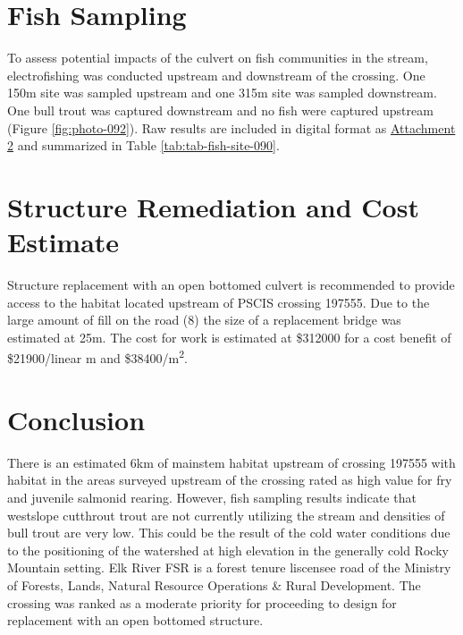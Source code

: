 \documentclass[
]{book}
\begin{document}
\hypertarget{fish-sampling-2}{%
\section*{Fish Sampling}\label{fish-sampling-2}}

To assess potential impacts of the culvert on fish communities in the stream, electrofishing was conducted upstream and downstream of the crossing. One 150m site was sampled upstream and one 315m site was sampled downstream. One bull trout was captured downstream and no fish were captured upstream (Figure \ref{fig:photo-092}). Raw results are included in digital format as \href{https://github.com/NewGraphEnvironment/fish_passage_elk_2020_reporting/raw/master/data/habitat_confirmations.xls}{Attachment 2} and summarized in Table \ref{tab:tab-fish-site-090}.

\hypertarget{structure-remediation-and-cost-estimate-6}{%
\section*{Structure Remediation and Cost Estimate}\label{structure-remediation-and-cost-estimate-6}}

Structure replacement with an open bottomed culvert is recommended to provide access to the habitat located upstream of PSCIS crossing 197555. Due to the large amount of fill on the road (8) the size of a replacement bridge was estimated at 25m. The cost for work is estimated at \$312000 for a cost benefit of \$21900/linear m and \$38400/m\textsuperscript{2}.

\hypertarget{conclusion-7}{%
\section*{Conclusion}\label{conclusion-7}}

There is an estimated 6km of mainstem habitat upstream of crossing 197555 with habitat in the areas surveyed upstream of the crossing rated as high value for fry and juvenile salmonid rearing. However, fish sampling results indicate that westslope cutthrout trout are not currently utilizing the stream and densities of bull trout are very low. This could be the result of the cold water conditions due to the positioning of the watershed at high elevation in the generally cold Rocky Mountain setting. Elk River FSR is a forest tenure liscensee road of the Ministry of Forests, Lands, Natural Resource Operations \& Rural Development. The crossing was ranked as a moderate priority for proceeding to design for replacement with an open bottomed structure.
\end{document}
